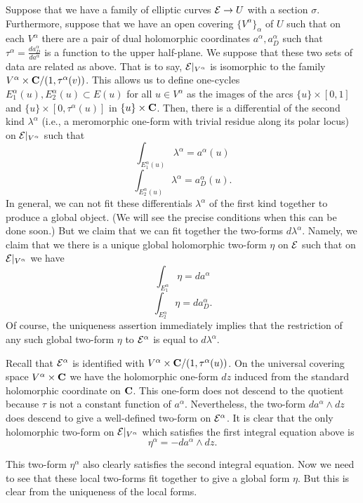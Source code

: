 \documentclass[10pt]{article}
\begin{document}
Suppose that we have  a family of elliptic curves ${\cal E}\to U$ with
a section $\sigma$. Furthermore, suppose that
we have an open covering $\{V^\alpha\}_\alpha$ of $U$ such that on
each $V^\alpha$ there are a pair of dual holomorphic coordinates
$a^\alpha,a^\alpha_D$ such that $\tau^\alpha=
\frac{da^\alpha_D}{da^\alpha}$ is a
function to the upper half-plane.
We suppose that these two sets of data are related as above.  That is
to say, 
${\cal E}|_{V^\alpha}$ 
is isomorphic to the family
$V^\alpha\times{\bf C}/(1,\tau^\alpha(v))$.
This allows us to define one-cycles
$E_1^\alpha(u),E_2^\alpha(u)\subset E(u)$ for all $u\in V^\alpha$ as
the images of the arcs $\{u\}\times [0,1]$ and $\{u\}\times
[0,\tau^\alpha(u)]$ in $\{u\}\times {\bf C}$. 
Then, there is a differential of the
second kind $\lambda^\alpha$ (i.e., a meromorphic one-form with trivial
residue along its polar locus) on ${\cal E}|_{V^\alpha}$ such that
$$\int_{E^\alpha_1(u)}\lambda^\alpha=a^\alpha(u)$$
$$\int_{E^\alpha_2(u)}\lambda^\alpha =a^\alpha_D(u).$$
In general, we can not fit these differentials $\lambda^\alpha$ of the
first kind together to produce a global object.  (We will see the precise
conditions when this can be done soon.) But 
we claim that we can fit together the two-forms $d\lambda^\alpha$.
Namely, we claim that we there is a unique global holomorphic two-form
$\eta$ on ${\cal E}$ 
such that on  ${\cal E}|_{V^\alpha}$ we have
$$\int_{E^\alpha_1}\eta=da^\alpha$$
$$\int_{E^\alpha_2}\eta=da^\alpha_D.$$
Of course, the uniqueness assertion immediately implies that the
restriction of any such global two-form $\eta$ 
to  ${\cal E}^\alpha$ is equal to 
$d\lambda^\alpha$.  


Recall that  ${\cal E}^\alpha$ is identified with $V^\alpha\times {\bf
C}/(1,\tau^\alpha(u))$. On the universal covering space
$V^\alpha\times {\bf C}$ we have the holomorphic one-form $dz$ induced
from the standard holomorphic coordinate on ${\bf C}$.
This one-form does not descend to the quotient because $\tau$ is not
a constant  function of $a^\alpha$. Nevertheless, the two-form
$da^\alpha \wedge dz$ does descend to give a well-defined two-form on
${\cal E}^\alpha$.
It is clear that the 
only holomorphic two-form on ${\cal
E}|_{V^\alpha}$ which satisfies 
the first integral equation above is 
$$\eta^\alpha=-da^\alpha\wedge dz.$$

This two-form $\eta^\alpha$ also clearly satisfies the second integral
equation. Now we need to see that these local two-forms fit together
to give a global form $\eta$.
But this is clear from the uniqueness of the local forms.
\end{document}
